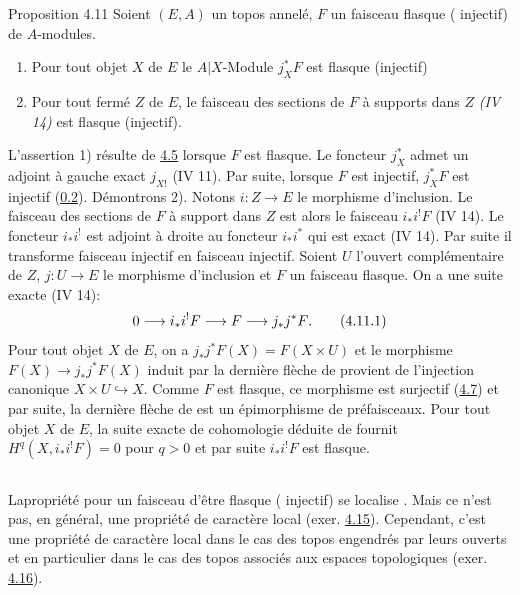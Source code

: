 \documentclass[10pt]{../fichiers-configuration-latex/smfart}
\begin{document}
\begin{enonce*}{Proposition 4.11}
Soient $(E, A)$ un topos annelé, $F$ un faisceau flasque (\resp
injectif) de $A$-modules.
\begin{enumerate}
\renewcommand{\labelenumi}{\theenumi)}
\item Pour tout objet $X$ de $E$ le $A | X$-Module $j_X^\ast F$ est
  flasque (\resp injectif)

\item Pour tout fermé $Z$ de $E$, le faisceau des sections de $F$
  à supports dans $Z$ \emph{(IV 14)} est flasque (\resp injectif).
\end{enumerate}
\end{enonce*}

L'assertion 1) résulte de \hyperref[V.cor4.5]{4.5} lorsque $F$ est flasque. Le foncteur
$j^\ast_X$ admet un adjoint à gauche exact $j_{X!}$ (IV 11). Par suite,
lorsque $F$ est injectif, $j^\ast_X F$ est injectif (\hyperref[V.prop0.2]{0.2}). Démontrons
2). Notons $i : Z \to E$ le morphisme d'inclusion. Le faisceau des
sections de $F$ à support dans $Z$ est alors le faisceau $i_\ast i^{!} F$ (IV 14). Le foncteur $i_\ast i^{!}$ est
adjoint à droite au foncteur $i_\ast i^\ast$ qui est exact (IV 14). Par
suite il transforme faisceau injectif en faisceau injectif. Soient $U$
l'ouvert complémentaire de $Z$, $j : U \to E$ le morphisme
d'inclusion et $F$ un faisceau flasque. On a une suite exacte (IV 14):
\begin{equation*}
0 \to i_\ast i^{!} F \to F \to j_\ast j^\ast F{\quoi}.\tag{4.11.1}
\end{equation*}
Pour tout objet $X$ de $E$, on a $j_\ast j^\ast F(X) = F(X \times U)$ et le
morphisme $F(X) \to j_\ast j^\ast F(X)$ induit par la dernière flèche de
 provient de l'injection canonique $X \times U \hookrightarrow
X$. Comme $F$ est flasque, ce morphisme est surjectif (\hyperref[V.prop4.7]{4.7}) et par
suite, la dernière flèche de  est un épimorphisme de
préfaisceaux. Pour tout objet $X$ de $E$, la suite exacte de
cohomologie déduite de  fournit $H^q(X, i_\ast i^{!}F) = 0$ pour
$q > 0$ et par suite $i_\ast i^{!}F$ est flasque.

\setcounter{subsection}{11}
\subsection{}
La\pageoriginale propriété pour un faisceau d'être flasque (\resp
injectif) se localise . Mais ce n'est pas, en
général, une propriété de caractère local (exer. \hyperref[V.exer4.15]{4.15}).
Cependant, c'est une propriété de caractère local dans le cas des
topos engendrés par leurs ouverts et en particulier dans le cas des
topos associés aux espaces topologiques (exer. \hyperref[V.exer4.16]{4.16}).
\end{document}
